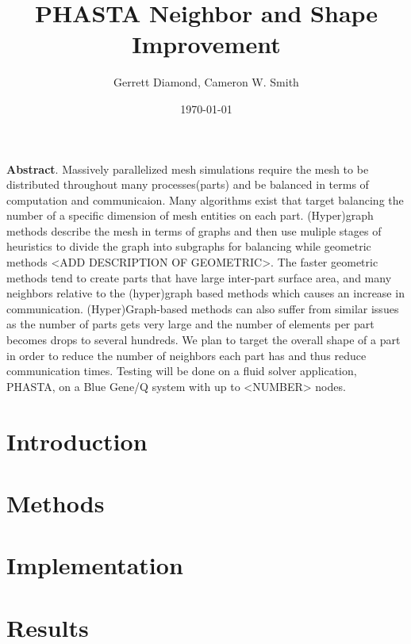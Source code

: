 \documentclass[a4paper]{article}
\title{PHASTA Neighbor and Shape Improvement}
\author{Gerrett Diamond, Cameron W. Smith}
\date{\today}
\begin{document}
\maketitle

\textbf{Abstract}. Massively parallelized mesh simulations require the mesh to be distributed throughout many processes(parts) and be balanced in terms of computation and communicaion. Many algorithms exist that target balancing the number of a specific dimension of mesh entities on each part. (Hyper)graph methods describe the mesh in terms of graphs and then use muliple stages of heuristics to divide the graph into subgraphs for balancing while geometric methods <ADD DESCRIPTION OF GEOMETRIC>. The faster geometric methods tend to create parts that have large inter-part surface area, and many neighbors relative to the (hyper)graph based methods which causes an increase in communication. (Hyper)Graph-based methods can also suffer from similar issues as the number of parts gets very large and the number of elements per part becomes drops to several hundreds.  We plan to target the overall shape of a part in order to reduce the number of neighbors each part has and thus reduce communication times. Testing will be done on a fluid solver application, PHASTA, on a Blue Gene/Q system with up to <NUMBER> nodes.
 
\section{Introduction}

\section{Methods}


\section{Implementation}

\section{Results}

\newpage


\end{document}
